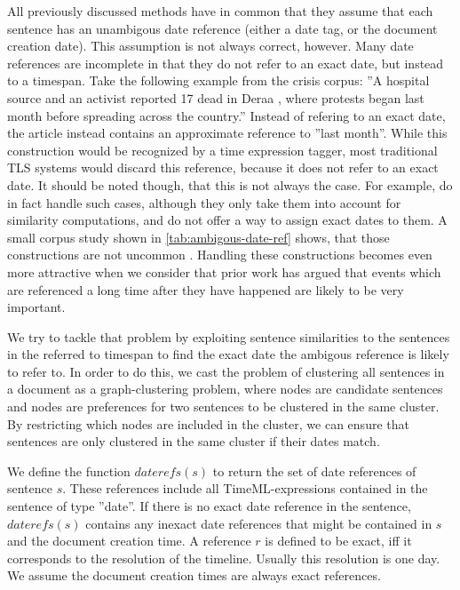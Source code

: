 \documentclass[a4paper,BCOR=10mm]{report}
\begin{document}
All previously discussed methods have in common that they assume that each sentence has an unambigous date reference (either a date tag, or the document creation date).
This assumption is not always correct, however. Many date references are incomplete in that they do not refer to an exact date, but instead to a timespan. Take the following example from the crisis corpus: ''A hospital source and an activist reported 17 dead in Deraa , where protests began last month before spreading across the country.'' %
Instead of refering to an exact date, the article instead contains an approximate reference to ''last month''. While this construction would be recognized by a time expression tagger, most traditional TLS systems would discard this reference, because it does not refer to an exact date.
 It should be noted though, that this is not always the case. For example, \citet{chieu} do in fact handle such cases, although they only take them into account for similarity computations, and do not offer a way to assign exact dates to them.
A small corpus study shown in \ref{tab:ambigous-date-ref} shows, that those constructions are not uncommon . %
Handling these constructions becomes even more attractive when we consider that prior work has argued that events which are referenced a long time after they have happened are likely to be very important. %

We try to tackle that problem by exploiting sentence similarities to the sentences in the referred to timespan to find the exact date the ambigous reference is likely to refer to. In order to do this, we cast the problem of clustering all sentences in a document as a graph-clustering problem, where nodes are candidate sentences and nodes are preferences for two sentences to be clustered in the same cluster. By restricting which nodes are included in the cluster, we can ensure that sentences are only clustered in the same cluster if their dates match.

We define the function $daterefs(s)$ to return the set of date references of sentence $s$. These references include all TimeML-expressions contained in the sentence of type ''date''. If there is no exact date reference in the sentence, $daterefs(s)$ contains any inexact date references that might be contained in $s$ and the document creation time.
A reference $r$ is defined to be exact, iff it corresponds to the resolution of the timeline. Usually this resolution is one day. We assume the document creation times are always exact references.
\end{document}
